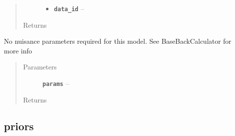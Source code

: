\documentclass[letterpaper,10pt,english]{sphinxmanual}
\begin{document}
\begin{fulllineitems}
\begin{fulllineitems}
\begin{quote}
\begin{description}
\begin{itemize}
\item {} 
\textbf{\texttt{data\_id}} -- 

\end{itemize}

\item[{Returns}] \leavevmode


\end{description}\end{quote}

\end{fulllineitems}


\begin{fulllineitems}
\label{modules:backcalc.ShiftBackCalc.logp_params}
No nuisance parameters required for this model. See BaseBackCalculator
for more info
\begin{quote}\begin{description}
\item[{Parameters}] \leavevmode
\textbf{\texttt{params}} -- 

\item[{Returns}] \leavevmode


\end{description}\end{quote}

\end{fulllineitems}


\end{fulllineitems}



\subsection{priors}
\label{modules:priors}\label{modules:module-priors}
\end{document}
